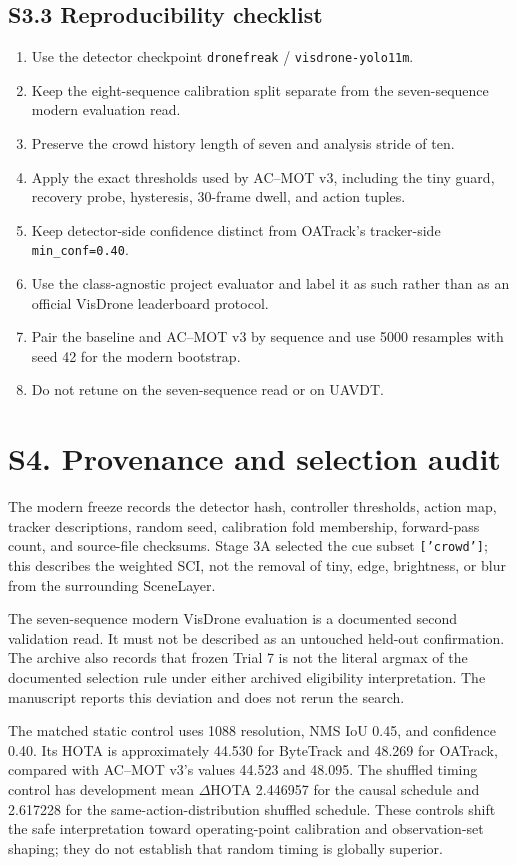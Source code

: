 \documentclass[11pt]{article}
\begin{document}
\subsection*{S3.3 Reproducibility checklist}
\begin{enumerate}[leftmargin=*]
\item Use the detector checkpoint \texttt{dronefreak} / \texttt{visdrone-yolo11m}.
\item Keep the eight-sequence calibration split separate from the seven-sequence
      modern evaluation read.
\item Preserve the crowd history length of seven and analysis stride of ten.
\item Apply the exact thresholds used by AC--MOT v3, including the tiny guard, recovery probe, hysteresis,
      30-frame dwell, and action tuples.
\item Keep detector-side confidence distinct from OATrack's tracker-side
      \texttt{min\_conf=0.40}.
\item Use the class-agnostic project evaluator and label it as such rather than
      as an official VisDrone leaderboard protocol.
\item Pair the baseline and AC--MOT v3 by sequence and use 5000 resamples with seed 42 for
      the modern bootstrap.
\item Do not retune on the seven-sequence read or on UAVDT.
\end{enumerate}

\section*{S4. Provenance and selection audit}

The modern freeze records the detector hash, controller thresholds, action map,
tracker descriptions, random seed, calibration fold membership, forward-pass
count, and source-file checksums. Stage 3A selected the cue subset
\texttt{['crowd']}; this describes the weighted SCI, not the removal of tiny,
edge, brightness, or blur from the surrounding SceneLayer.

The seven-sequence modern VisDrone evaluation is a documented second validation
read. It must not be described as an untouched held-out confirmation. The
archive also records that frozen Trial 7 is not the literal argmax of the
documented selection rule under either archived eligibility interpretation. The
manuscript reports this deviation and does not rerun the search.

The matched static control uses 1088 resolution, NMS IoU 0.45, and confidence
0.40. Its HOTA is approximately 44.530 for ByteTrack and 48.269 for OATrack,
compared with AC--MOT v3's values 44.523 and 48.095. The shuffled timing control has
development mean $\Delta$HOTA 2.446957 for the causal schedule and 2.617228 for
the same-action-distribution shuffled schedule. These controls shift the safe
interpretation toward operating-point calibration and observation-set shaping;
they do not establish that random timing is globally superior.
\end{document}
